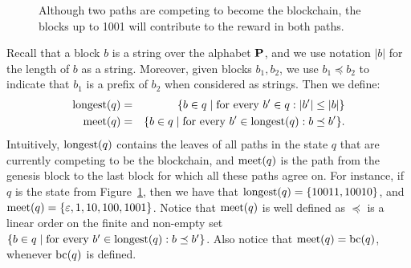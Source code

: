 \begin{figure}
\centering
{} 
\vspace*{-15pt}
\caption{Although two paths are competing to become the blockchain, the blocks up to 1001 will contribute to the reward in both paths. \label{fig-simple-fork}}
\end{figure}

Recall that a block $b$ is a string over the alphabet $\mathbf{P}$, and we use notation $|b|$ for the length of $b$ as a string. Moreover, given blocks $b_1, b_2$, we use %
$b_1 \preceq b_2$ to indicate that $b_1$ is a prefix of $b_2$ when considered as strings. Then we define: 
\begin{eqnarray*}
{\text{\rm longest}}(q) & = & \{ b \in q \mid \text{for every } b' \in q: |b'| \leq |b|\}\\
\text{\rm meet}(q) & = & \{b \in q \mid \text{for every } b' \in {\text{\rm longest}}(q): b \preceq b'\}.
\end{eqnarray*}
Intuitively, ${\text{\rm longest}}(q)$ contains the leaves of all paths in the state $q$ that are currently competing to be the blockchain, and $\text{\rm meet}(q)$ is the path from the genesis block to the last block for which all these paths agree on. For instance, if $q$ is the state from Figure~\ref{fig-simple-fork}, then we have that ${\text{\rm longest}}(q)=\{10011,10010\}$, and $\text{\rm meet}(q)=\{\varepsilon, 1, 10, 100, 1001\}$. Notice that $\text{\rm meet}(q)$ is well defined as $\preceq$ is a linear order on the finite and non-empty set $\{b \in q \mid \text{for every } b' \in {\text{\rm longest}}(q): b \preceq b'\}$. Also notice that $\text{\rm meet}(q)=\text{bc}(q)$, whenever $\text{bc}(q)$ is defined.

